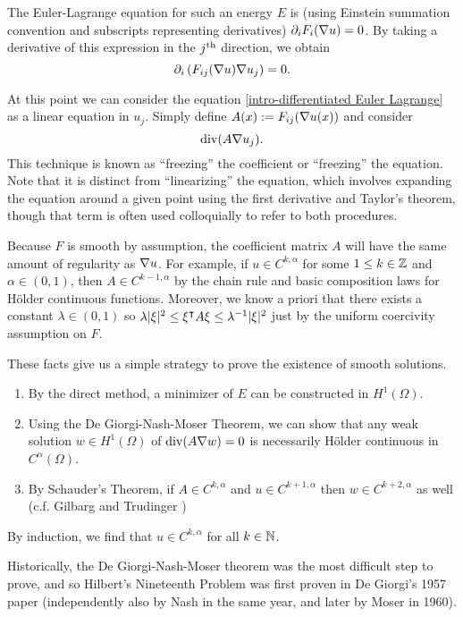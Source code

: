 The Euler-Lagrange equation for such an energy $E$ is (using Einstein summation convention and subscripts representing derivatives) $\partial_i F_i(\nabla u) = 0$.  By taking a derivative of this expression in the $j^\mathrm{th}$ direction,  we obtain
\begin{equation} \label{intro-differentiated Euler Lagrange} \partial_i \left(  F_{ij}(\nabla u) \nabla u_j \right) = 0. \end{equation}

At this point we can consider the equation \eqref{intro-differentiated Euler Lagrange} as a linear equation in $u_j$.  Simply define $A(x) := F_{ij}(\nabla u(x))$ and consider
\[ \operatorname{div}( A \nabla u_j). \]
This technique is known as ``freezing'' the coefficient or ``freezing'' the equation.  Note that it is distinct from ``linearizing'' the equation, which involves expanding the equation around a given point using the first derivative and Taylor's theorem, though that term is often used colloquially to refer to both procedures.  

Because $F$ is smooth by assumption, the coefficient matrix $A$ will have the same amount of regularity as $\nabla u$.  For example, if $u \in C^{k,\alpha}$ for some $1 \leq k \in \mathbb{Z}$ and $\alpha \in (0,1)$, then $A \in C^{k-1,\alpha}$ by the chain rule and basic composition laws for H\"{o}lder continuous functions.  Moreover, we know a priori that there exists a constant $\lambda \in (0,1)$ so $\lambda |\xi|^2 \leq \xi^\intercal A \xi \leq \lambda^{-1} |\xi|^2$ just by the uniform coercivity assumption on $F$.  

These facts give us a simple strategy to prove the existence of smooth solutions.  
\begin{enumerate}
\item By the direct method, a minimizer of $E$ can be constructed in $H^1(\Omega)$.   \\
\item Using the De Giorgi-Nash-Moser Theorem, we can show that any weak solution $w \in H^1(\Omega)$ of $\operatorname{div}(A \nabla w) = 0$ is necessarily H\"{o}lder continuous in $C^\alpha(\Omega)$.  \\
\item By Schauder's Theorem, if $A \in C^{k,\alpha}$ and $u \in C^{k+1,\alpha}$ then $w \in C^{k+2,\alpha}$ as well (c.f. Gilbarg and Trudinger \cite{GiTr})
\end{enumerate}
By induction, we find that $u \in C^{k,\alpha}$ for all $k \in \mathbb{N}$.  

Historically, the De Giorgi-Nash-Moser theorem was the most difficult step to prove, and so Hilbert's Nineteenth Problem was first proven in De Giorgi's 1957 paper \cite{DG} (independently also by Nash \cite{Na.dg} in the same year, and later by Moser \cite{Mo.dg} in 1960).  

